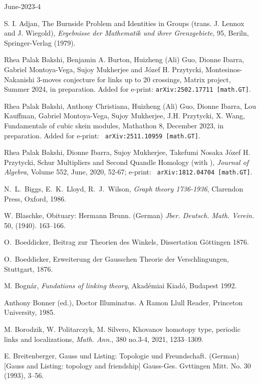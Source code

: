 \documentclass[12pt]{amsart}
\begin{document}
\begin{thebibliography}{June-2023-4}

 S. I. Adjan, The Burnside Problem and Identities in
Groups (trans. J. Lennox and J. Wiegold), \textit{Ergebnisse der Mathematik
und ihrer Grenzgebiete}, 95, Beriln, Springer-Verlag (1979).

Rhea Palak Bakshi,  Benjamin A. Burton, Huizheng (Ali) Guo,  Dionne Ibarra, Gabriel Montoya-Vega, Sujoy Mukherjee and J\'ozef H. Przytycki,
Montesinos-Nakanishi 3-moves conjecture for links up to 20 crossings, Matrix project, Summer 2024, in preparation. {\color{red} Added for e-print: {\tt arXiv:2502.17711 [math.GT]}. }

 Rhea Palak Bakshi, Anthony Christiana, Huizheng (Ali) Guo, Dionne Ibarra,  Lou Kauffman, Gabriel Montoya-Vega, Sujoy Mukherjee, J.H. Przytycki, X. Wang, 
Fundamentals of cubic skein modules, Mathathon 8, December 2023, in preparation. {\color{red} Added for e-print: \ {\tt arXiv:2511.10959 [math.GT]}.}

  Rhea Palak Bakshi, Dionne Ibarra, Sujoy Mukherjee, Takefumi Nosaka J\'ozef H. Przytycki, 
 Schur Multipliers and Second Quandle Homology (with ),
{\it Journal of Algebra}, Volume 552, June, 2020, 52-67;
e-print: \ {\tt arXiv:1812.04704 [math.GT]}.

 N.~L.~Biggs,  E.~K.~Lloyd, R.~J.~Wilson,
{\it Graph theory 1736-1936},  Clarendon Press,   Oxford,  1986.

W. Blaschke, Obituary: Hermann Brunn. (German)
{\it Jber. Deutsch. Math. Verein.} 50, (1940). 163--166.

O.~Boeddicker, Beitrag zur Theorien des Winkels, Dissertation G\"ottingen
1876.

O.~Boeddicker, Erweiterung der Gausschen Theorie der Verschlingungen,
Stuttgart, 1876.

M. Bogn\'ar, {\it Fundations of linking theory}, Akad\'emiai Kiad\'o,
Budapest 1992.

Anthony Bonner (ed.), Doctor Illuminatus. A Ramon Llull Reader, Princeton University, 1985.

 M. Borodzik, W. Politarczyk, M. Silvero, 
Khovanov homotopy type, periodic links and localizations,
{\it Math. Ann.}, 380 no.3-4, 2021, 1233–1309.

E. Breitenberger,
Gauss und Listing: Topologie und Freundschaft. (German)
[Gauss and Listing: topology and friendship]
Gauss-Ges. Gvttingen Mitt. No. 30 (1993), 3--56.


\end{thebibliography}
\end{document}
